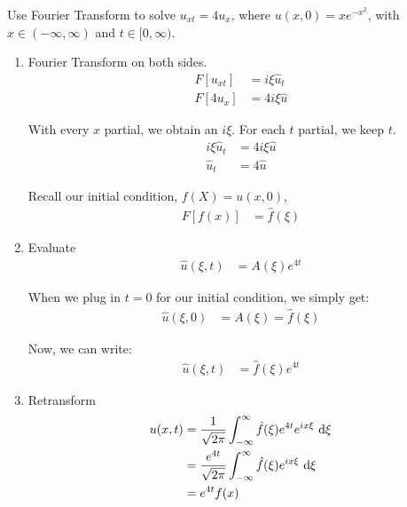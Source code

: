 \documentclass{article}
\begin{document}
Use Fourier Transform to solve $u_{xt} = 4u_x$, where $u(x, 0) = xe^{-x^2}$, with $x \in (-\infty, \infty)$ and $t \in [0, \infty)$.

\begin{enumerate}
  \item Fourier Transform on both sides.
  \begin{align}
    F[u_{xt}] & = i \xi \hat u_t\\
    F[4u_x] & = 4 i \xi \hat u
  \end{align}

  With every $x$ partial, we obtain an $i \xi$. For each $t$ partial, we keep $t$.
  \begin{align}
    i \xi \hat u_t & = 4 i \xi \hat u\\
    \hat u_t & = 4 \hat u
  \end{align}

  Recall our initial condition, $f(X) = u(x, 0)$,
  \begin{align}
    F[f(x)] & = \hat f(\xi)
  \end{align}

  \item Evaluate
  \begin{align}
    \hat u(\xi, t) & = A(\xi) e^{4t}
  \end{align}

  When we plug in $t = 0$ for our initial condition, we simply get:
  \begin{align}
    \hat u(\xi, 0) & = A(\xi) = \hat f(\xi)
  \end{align}

  Now, we can write:
  \begin{align}
    \hat u(\xi, t) & = \hat f(\xi) e^{4t}
  \end{align}

  \item Retransform
  \begin{align}
    u(x, t) & = \frac{1}{\sqrt{2 \pi}}
    \int^\infty_{-\infty} \hat f(\xi) e^{4t} e^{i x \xi}\ \text d\xi\\
    & = \frac{e^{4t}}{\sqrt{2 \pi}}
    \int^\infty_{-\infty} \hat f(\xi) e^{i x \xi}\ \text d \xi\\
    & = e^{4t} f(x)
  \end{align}
\end{enumerate}
\end{document}
